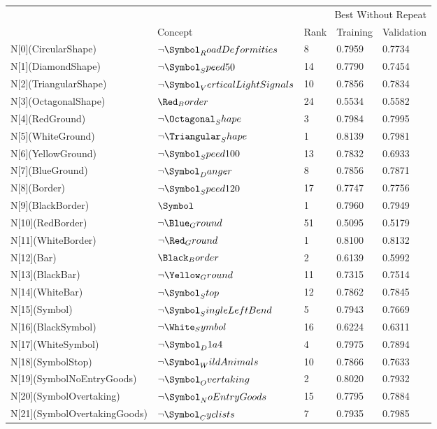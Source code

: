 \begin{tabular}{lllll}
\toprule
 & \multicolumn{4}{r}{Best Without Repeat} \\
 & Concept & Rank & Training & Validation \\
\midrule
N[0](CircularShape) & $\neg \Symbol_RoadDeformities$ & 8 & 0.7959 & 0.7734 \\
N[1](DiamondShape) & $\neg \Symbol_Speed50$ & 14 & 0.7790 & 0.7454 \\
N[2](TriangularShape) & $\neg \Symbol_VerticalLightSignals$ & 10 & 0.7856 & 0.7834 \\
N[3](OctagonalShape) & $\Red_Border$ & 24 & 0.5534 & 0.5582 \\
N[4](RedGround) & $\neg \Octagonal_Shape$ & 3 & 0.7984 & 0.7995 \\
N[5](WhiteGround) & $\neg \Triangular_Shape$ & 1 & 0.8139 & 0.7981 \\
N[6](YellowGround) & $\neg \Symbol_Speed100$ & 13 & 0.7832 & 0.6933 \\
N[7](BlueGround) & $\neg \Symbol_Danger$ & 8 & 0.7856 & 0.7871 \\
N[8](Border) & $\neg \Symbol_Speed120$ & 17 & 0.7747 & 0.7756 \\
N[9](BlackBorder) & $\Symbol$ & 1 & 0.7960 & 0.7949 \\
N[10](RedBorder) & $\neg \Blue_Ground$ & 51 & 0.5095 & 0.5179 \\
N[11](WhiteBorder) & $\neg \Red_Ground$ & 1 & 0.8100 & 0.8132 \\
N[12](Bar) & $\Black_Border$ & 2 & 0.6139 & 0.5992 \\
N[13](BlackBar) & $\neg \Yellow_Ground$ & 11 & 0.7315 & 0.7514 \\
N[14](WhiteBar) & $\neg \Symbol_Stop$ & 12 & 0.7862 & 0.7845 \\
N[15](Symbol) & $\neg \Symbol_SingleLeftBend$ & 5 & 0.7943 & 0.7669 \\
N[16](BlackSymbol) & $\neg \White_Symbol$ & 16 & 0.6224 & 0.6311 \\
N[17](WhiteSymbol) & $\neg \Symbol_D1a4$ & 4 & 0.7975 & 0.7894 \\
N[18](SymbolStop) & $\neg \Symbol_WildAnimals$ & 10 & 0.7866 & 0.7633 \\
N[19](SymbolNoEntryGoods) & $\neg \Symbol_Overtaking$ & 2 & 0.8020 & 0.7932 \\
N[20](SymbolOvertaking) & $\neg \Symbol_NoEntryGoods$ & 15 & 0.7795 & 0.7884 \\
N[21](SymbolOvertakingGoods) & $\neg \Symbol_Cyclists$ & 7 & 0.7935 & 0.7985 \\

\end{tabular}
